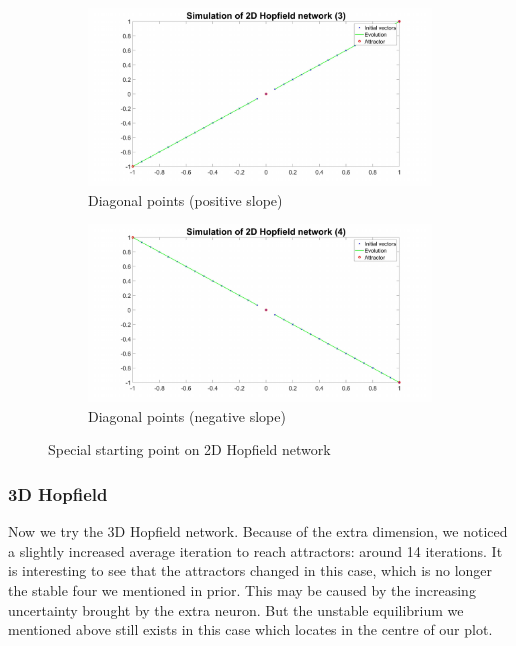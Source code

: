 \documentclass{article}
\begin{document}
\begin{figure}[h!]
\begin{subfigure}[b]{.49\textwidth}
  \centering
  \includegraphics[width=\linewidth]{lab2/2d3.pdf}
  \caption{Diagonal points (positive slope)}
  \label{fig:diagpos}
\end{subfigure}
\hfill
\begin{subfigure}[b]{.49\textwidth}
  \centering
  \includegraphics[width=\linewidth]{lab2/2d4.pdf}
  \caption{Diagonal points (negative slope)}
  \label{fig:diagneg}
\end{subfigure}
\caption{Special starting point on 2D Hopfield network}
\label{fig:hop2d}
\end{figure}


\subsubsection{3D Hopfield}

Now we try the 3D Hopfield network. Because of the extra dimension, we noticed a slightly increased average iteration to reach attractors: around 14 iterations. It is interesting to see that the attractors changed in this case, which is no longer the stable four we mentioned in prior. This may be caused by the increasing uncertainty brought by the extra neuron. But the unstable equilibrium we mentioned above still exists in this case which locates in the centre of our plot. 
\end{document}
